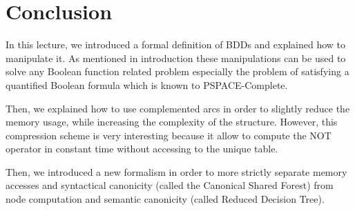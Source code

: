 \documentclass[a4paper,10pt]{article}
\begin{document}
\section{Conclusion}

In this lecture, we introduced a formal definition of BDDs and explained how to manipulate it.
As mentioned in introduction these manipulations can be used to solve any Boolean function related problem especially the problem of satisfying a quantified Boolean formula which is known to PSPACE-Complete.


Then, we explained how to use complemented arcs in order to slightly reduce the memory usage, while increasing the complexity of the structure.
However, this compression scheme is very interesting because it allow to compute the NOT operator in constant time without accessing to the unique table.


Then, we introduced a new formalism in order to more strictly separate memory accesses and syntactical canonicity (called the Canonical Shared Forest) from node computation and semantic canonicity (called Reduced Decision Tree).

\newpage
{}

\end{document}

